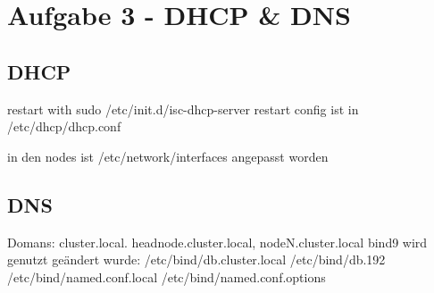 \chapter{Aufgabe 3 - DHCP \& DNS}
\section{DHCP}
restart with
sudo /etc/init.d/isc-dhcp-server restart
config ist in /etc/dhcp/dhcp.conf

in den nodes ist /etc/network/interfaces angepasst worden

\section{DNS}
Domans: cluster.local. headnode.cluster.local, nodeN.cluster.local
bind9 wird genutzt
geändert wurde:
/etc/bind/db.cluster.local
/etc/bind/db.192
/etc/bind/named.conf.local
/etc/bind/named.conf.options
